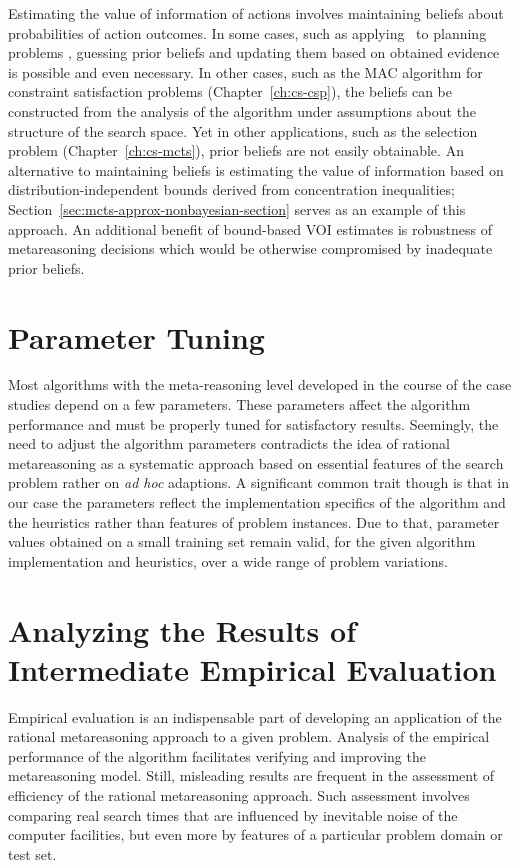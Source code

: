 Estimating the value of information of actions involves maintaining
beliefs about probabilities of action outcomes. In some cases, such as
applying \rationallazyastar~to planning problems
\cite{TolpinEtAl.rla}, guessing prior beliefs and updating them based
on obtained evidence is possible and even necessary. In other cases,
such as the MAC algorithm for constraint satisfaction problems
(Chapter~\ref{ch:cs-csp}), the beliefs can be constructed from the
analysis of the algorithm under assumptions about the structure of the
search space. Yet in other applications, such as the selection problem
(Chapter~\ref{ch:cs-mcts}), prior beliefs are not easily obtainable. An
alternative to maintaining beliefs is estimating the value of
information based on distribution-independent bounds derived from
concentration inequalities;
Section~\ref{sec:mcts-approx-nonbayesian-section} serves as an example  
of this approach. An additional benefit of bound-based VOI estimates 
is robustness of metareasoning decisions which would be otherwise
compromised by inadequate prior beliefs. 

\section{Parameter Tuning}

Most algorithms with the meta-reasoning level developed in the course
of the case studies depend on a few parameters. These parameters
affect the algorithm performance and must be properly tuned for
satisfactory results. Seemingly, the need to adjust the algorithm
parameters contradicts the idea of rational metareasoning as a
systematic approach based on essential features of the search problem
rather on \textit{ad hoc} adaptions. A significant common trait though
is that in our case the parameters reflect the implementation specifics
of the algorithm and the heuristics rather than features of problem
instances. Due to that, parameter values obtained on a small training
set remain valid, for the given algorithm implementation and
heuristics, over a wide range of problem variations. 

\section{Analyzing the Results of Intermediate Empirical Evaluation}

Empirical evaluation is an indispensable part of developing an
application of the rational metareasoning approach to a given
problem. Analysis of the empirical performance of the algorithm
facilitates verifying and improving the metareasoning model.  Still,
misleading results are frequent in the assessment of efficiency of the
rational metareasoning approach. Such assessment involves comparing
real search times that are influenced by inevitable noise of the
computer facilities, but even more by features of a particular problem
domain or test set. 

